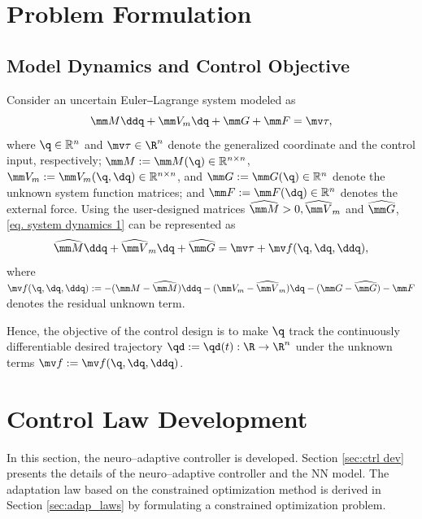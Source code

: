 \documentclass[letterpaper, 10 pt, conference]{ieeeconf}  %
\begin{document}
\section{Problem Formulation}\label{sec: Problem Formulation}

\subsection{Model Dynamics and Control Objective}

Consider an uncertain Euler‒Lagrange system modeled as
\begin{equation}
    \mm M\ddq + \mm V_m\dq+ \mm G + \mm F 
    =
    \mv\tau 
    ,
    \label{eq. system dynamics 1}
\end{equation}
where $\q\in \mathbb{R}^n$ and $\mv \tau\in\R^n$ denote the generalized coordinate and the control input, respectively; $\mm M :=\mm M(\q)\in\mathbb{R}^{n\times n}$, $\mm V_m:= \mm V_m(\q,\dq)\in\mathbb{R}^{n\times n}$, and $\mm G:=\mm G(\q)\in\mathbb{R}^{n}$ denote the unknown system function matrices; and $\mm F:=\mm F(\dq)\in\mathbb{R}^{n}$ denotes the external force.
Using the user-designed matrices $\widehat{\mm M}>0,\widehat{\mm V}_m$ and $\widehat{\mm G}$, \eqref{eq. system dynamics 1} can be represented as 
\begin{equation}
    \widehat{\mm M}\ddq+\widehat{\mm V}_m\dq+\widehat{\mm G} = \mv \tau + \mv f(\q,\dq,\ddq)
    ,
    \label{eq. system dynamics 2}
\end{equation}
where $\mv f(\q,\dq,\ddq) := -(\mm M-\widehat{\mm M})\ddq-(\mm V_m-\widehat{\mm V}_m)\dq -(\mm G-\widehat{\mm G}) -\mm F$ denotes the residual unknown term.

Hence, the objective of the control design is to make $\q$ track the continuously differentiable desired trajectory $\qd:=\qd(t):\R\to \R^n$ under the unknown terms $\mv f:=\mv f(\q,\dq,\ddq)$.

\section{Control Law Development}\label{sec:ctrl design}

In this section, the neuro–adaptive controller is developed.
Section \ref{sec:ctrl dev} presents the details of the neuro–adaptive controller and the NN model.
The adaptation law based on the constrained optimization method is derived in Section \ref{sec:adap_laws} by formulating a constrained optimization problem.
\end{document}
